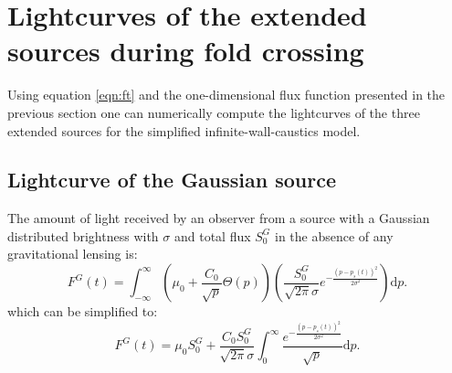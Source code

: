 \documentclass[usenatbib]{mn2e}
\begin{document}
\section{Lightcurves of the extended sources during fold crossing}\label{sec:fold-crossing}

Using equation \ref{eqn:ft} and the one-dimensional flux function
presented in the previous section one can numerically compute the
lightcurves of the three extended sources for the simplified
infinite-wall-caustics model.

\subsection{Lightcurve of the Gaussian source}

The amount of light received by an observer from a source 
with a Gaussian distributed brightness with $\sigma$ and total flux $S_0^G$ in the absence of any gravitational lensing is:
\begin{equation}
 F^G(t) = \int_{-\infty}^\infty  \left( \mu_0 + \frac{C_0}{\sqrt{p}} \Theta \left( p \right) \right) \left( \frac{S_0^G}{\sqrt{2 \pi} \sigma} e^{-\frac{(p-p_s(t))^2}{2 \sigma^2}} \right) \mathrm{d}p.
\end{equation}
which can be simplified to:
\begin{equation}
 F^G(t) = \mu_0 S_0^G + \frac{C_0 S_0^G}{\sqrt{2\pi} \sigma} \int_{0}^\infty \frac{e^{-\frac{(p-p_s(t))^2}{2 \sigma^2}}}{\sqrt{p}} \mathrm{d}p.
\end{equation}
\end{document}
